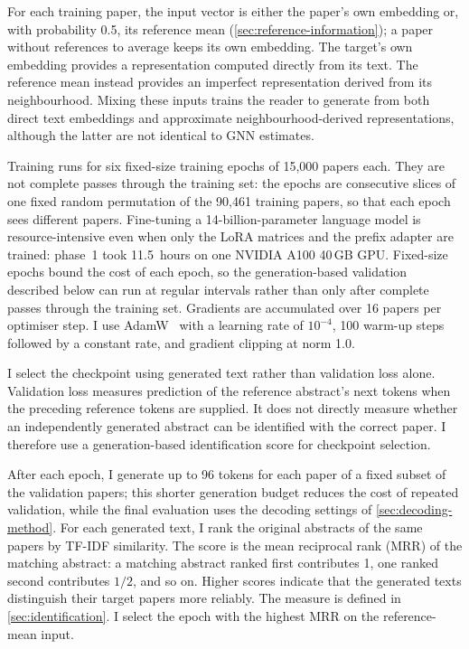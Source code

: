 For each training paper, the input vector is either the paper's own embedding or, with probability 0.5, its reference mean (\autoref{sec:reference-information}); a paper without references to average keeps its own embedding. The target's own embedding provides a representation computed directly from its text. The reference mean instead provides an imperfect representation derived from its neighbourhood. Mixing these inputs trains the reader to generate from both direct text embeddings and approximate neighbourhood-derived representations, although the latter are not identical to GNN estimates.

Training runs for six fixed-size training epochs of 15,000 papers each. They are not complete passes through the training set: the epochs are consecutive slices of one fixed random permutation of the 90,461 training papers, so that each epoch sees different papers. Fine-tuning a 14-billion-parameter language model is resource-intensive even when only the LoRA matrices and the prefix adapter are trained: phase~1 took 11.5~hours on one NVIDIA A100 40\,GB GPU. Fixed-size epochs bound the cost of each epoch, so the generation-based validation described below can run at regular intervals rather than only after complete passes through the training set. Gradients are accumulated over 16 papers per optimiser step. I use AdamW~\cite{loshchilov2019decoupled} with a learning rate of $10^{-4}$, 100 warm-up steps followed by a constant rate, and gradient clipping at norm 1.0.

I select the checkpoint using generated text rather than validation loss alone. Validation loss measures prediction of the reference abstract's next tokens when the preceding reference tokens are supplied. It does not directly measure whether an independently generated abstract can be identified with the correct paper. I therefore use a generation-based identification score for checkpoint selection.

After each epoch, I generate up to 96 tokens for each paper of a fixed subset of the validation papers; this shorter generation budget reduces the cost of repeated validation, while the final evaluation uses the decoding settings of \autoref{sec:decoding-method}. For each generated text, I rank the original abstracts of the same papers by TF-IDF similarity. The score is the mean reciprocal rank (MRR) of the matching abstract: a matching abstract ranked first contributes 1, one ranked second contributes $1/2$, and so on. Higher scores indicate that the generated texts distinguish their target papers more reliably. The measure is defined in \autoref{sec:identification}. I select the epoch with the highest MRR on the reference-mean input.

